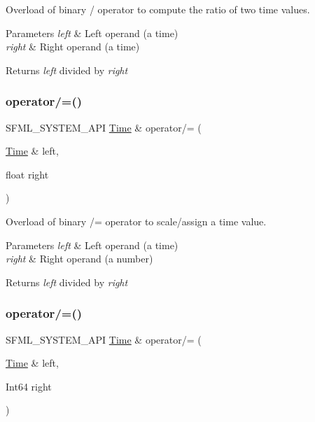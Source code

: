 Overload of binary / operator to compute the ratio of two time values. 


\begin{DoxyParams}{Parameters}
{\em left} & Left operand (a time) \\
\hline
{\em right} & Right operand (a time)\\
\hline
\end{DoxyParams}
\begin{DoxyReturn}{Returns}
{\itshape left} divided by {\itshape right} 
\end{DoxyReturn}
\mbox{\label{classsf_1_1_time_a9835490c54cab06492ec3aa9e9275ef9}} 
\subsubsection{\texorpdfstring{operator/=()}{operator/=()}\hspace{0.1cm}{\footnotesize\ttfamily [1/2]}}
{\footnotesize\ttfamily S\+F\+M\+L\+\_\+\+S\+Y\+S\+T\+E\+M\+\_\+\+A\+PI \hyperlink{classsf_1_1_time}{Time} \& operator/= (\begin{DoxyParamCaption}\item[{\hyperlink{classsf_1_1_time}{Time} \&}]{left,  }\item[{float}]{right }\end{DoxyParamCaption})\hspace{0.3cm}{\ttfamily [related]}}



Overload of binary /= operator to scale/assign a time value. 


\begin{DoxyParams}{Parameters}
{\em left} & Left operand (a time) \\
\hline
{\em right} & Right operand (a number)\\
\hline
\end{DoxyParams}
\begin{DoxyReturn}{Returns}
{\itshape left} divided by {\itshape right} 
\end{DoxyReturn}
\mbox{\label{classsf_1_1_time_ad51871e3db77def834ae8688e64504ff}} 
\subsubsection{\texorpdfstring{operator/=()}{operator/=()}\hspace{0.1cm}{\footnotesize\ttfamily [2/2]}}
{\footnotesize\ttfamily S\+F\+M\+L\+\_\+\+S\+Y\+S\+T\+E\+M\+\_\+\+A\+PI \hyperlink{classsf_1_1_time}{Time} \& operator/= (\begin{DoxyParamCaption}\item[{\hyperlink{classsf_1_1_time}{Time} \&}]{left,  }\item[{Int64}]{right }\end{DoxyParamCaption})\hspace{0.3cm}{\ttfamily [related]}}



